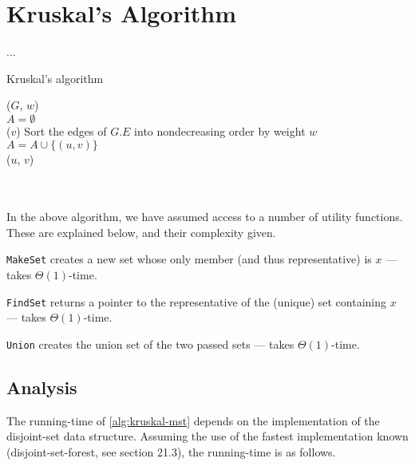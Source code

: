 \newpage
\section{Kruskal's Algorithm}
... \\
\begin{algorithm}[H]
	\caption{Kruskal's algorithm}
	\label{alg:kruskal-mst}
	
	
	
	
	\BlankLine
	\KruskalMST($G$, $w$) \\
	\Begin
	{
		$A = \emptyset$ \\
		{
			\MakeSet($v$)
		}
		Sort the edges of $G.E$ into nondecreasing order by weight $w$ \\
		
		{
			{
				$A = A \cup \{(u, v)\}$ \\
				\Union($u$, $v$)
			}
		}
	}
\end{algorithm}{\ }\\\\
In the above algorithm, we have assumed access to a number of utility
functions. These are explained below, and their complexity given.
\begin{description}
	\item \texttt{MakeSet} creates a new set whose only member (and thus
representative) is $x$ --- takes $\Theta(1)$-time.
	\item \texttt{FindSet} returns a pointer to the representative of the
(unique) set containing $x$ --- takes $\Theta(1)$-time.
	\item \texttt{Union} creates the union set of the two passed sets ---
takes $\Theta(1)$-time.
\end{description}

\newpage
\subsection{Analysis}
The running-time of \ref{alg:kruskal-mst} depends on the implementation of
the disjoint-set data structure. Assuming the use of the fastest
implementation known (disjoint-set-forest, see section
21.3\cite[p. 568]{clrs}), the running-time is as follows.

